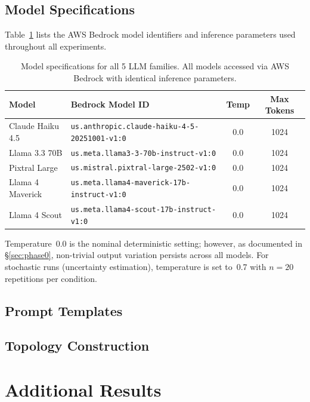 \documentclass{article}
\begin{document}
\subsection{Model Specifications}

Table~\ref{tab:model_specs} lists the AWS Bedrock model identifiers and inference parameters used throughout all experiments.

\begin{table}[h]
\centering
\caption{Model specifications for all 5 LLM families. All models accessed via AWS Bedrock with identical inference parameters.}
\label{tab:model_specs}
\begin{tabular}{@{}llcc@{}}
\toprule
Model & Bedrock Model ID & Temp & Max Tokens \\
\midrule
Claude Haiku 4.5 & \texttt{us.anthropic.claude-haiku-4-5-20251001-v1:0} & 0.0 & 1024 \\
Llama 3.3 70B    & \texttt{us.meta.llama3-3-70b-instruct-v1:0}          & 0.0 & 1024 \\
Pixtral Large    & \texttt{us.mistral.pixtral-large-2502-v1:0}          & 0.0 & 1024 \\
Llama 4 Maverick & \texttt{us.meta.llama4-maverick-17b-instruct-v1:0}   & 0.0 & 1024 \\
Llama 4 Scout    & \texttt{us.meta.llama4-scout-17b-instruct-v1:0}      & 0.0 & 1024 \\
\bottomrule
\end{tabular}
\end{table}

Temperature~0.0 is the nominal deterministic setting; however, as documented in \S\ref{sec:phase0}, non-trivial output variation persists across all models. For stochastic runs (uncertainty estimation), temperature is set to~0.7 with $n = 20$ repetitions per condition.

\subsection{Prompt Templates}

\subsection{Topology Construction}

\section{Additional Results}
\label{app:results}



\newpage

\end{document}
